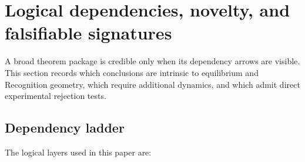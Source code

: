 \section{Logical dependencies, novelty, and falsifiable signatures}
\label{sec:dependency-falsifiability}

A broad theorem package is credible only when its dependency arrows are visible.  This section records which conclusions are intrinsic to equilibrium and Recognition geometry, which require additional dynamics, and which admit direct experimental rejection tests.

\subsection{Dependency ladder}

The logical layers used in this paper are:
